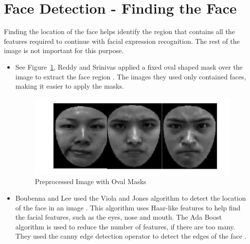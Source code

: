\section{Face Detection - Finding the Face  }

Finding the location of the face helps identify the region that contains all the features required to continue with facial expression recognition. The rest of the image is not important for this purpose.
\begin{itemize}
\item See Figure~\ref{fig:oval}, Reddy and Srinivas applied a fixed oval shaped mask over the image to extract the face region \cite{2}. The images they used only contained faces, making it easier to apply the masks.

\begin{figure}[ht]
  \centering
  \includegraphics[scale=0.8]{6}
  \caption{Preprocessed Image with Oval Masks}
  \label{fig:oval}
\end{figure}

\item Boubenna and Lee used the Viola and Jones algorithm to detect the location of the face in an image \cite{viola}. This algorithm uses Haar-like features to help find the facial features, such as the eyes, nose and mouth. The Ada Boost algorithm is used to reduce the number of features, if there are too many. They used the canny edge detection operator to detect the edges of the face \cite{3}.
\end{itemize}


